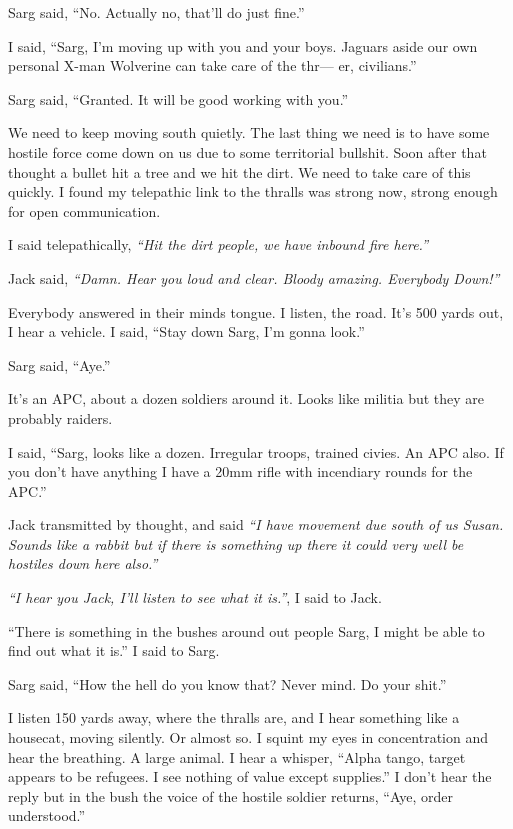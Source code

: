 Sarg said, ``No. Actually no, that'll do just fine.''

I said, ``Sarg, I'm moving up with you and your boys. Jaguars aside our own personal X-man Wolverine can take care of the thr--- er, civilians.''

Sarg said, ``Granted. It will be good working with you.''

We need to keep moving south quietly. The last thing we need is to have some hostile force come down on us due to some territorial bullshit. Soon after that thought a bullet hit a tree and we hit the dirt. We need to take care of this quickly. I found my telepathic link to the thralls was strong now, strong enough for open communication.

I said telepathically, \textit{``Hit the dirt people, we have inbound fire here.''}

Jack said, \textit{``Damn. Hear you loud and clear. Bloody amazing. Everybody Down!''}

Everybody answered in their minds tongue. I listen, the road. It's 500 yards out, I hear a vehicle. I said, ``Stay down Sarg, I'm gonna look.''

Sarg said, ``Aye.''

It's an APC, about a dozen soldiers around it. Looks like militia but they are probably raiders.

I said, ``Sarg, looks like a dozen. Irregular troops, trained civies. An APC also. If you don't have anything I have a 20mm rifle with incendiary rounds for the APC.''

Jack transmitted by thought, and said \textit{``I have movement due south of us Susan. Sounds like a rabbit but if there is something up there it could very well be hostiles down here also.''}

\textit{``I hear you Jack, I'll listen to see what it is.''}, I said to Jack.

``There is something in the bushes around out people Sarg, I might be able to find out what it is.'' I said to Sarg.

Sarg said, ``How the hell do you know that? Never mind. Do your shit.''

I listen 150 yards away, where the thralls are, and I hear something like a housecat, moving silently. Or almost so. I squint my eyes in concentration and hear the breathing. A large animal. I hear a whisper, ``Alpha tango, target appears to be refugees. I see nothing of value except supplies.'' I don't hear the reply but in the bush the voice of the hostile soldier returns, ``Aye, order understood.''

